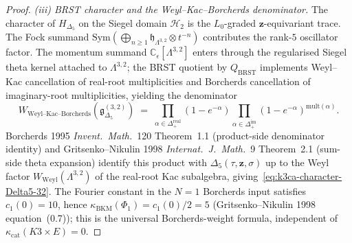 \begin{proof}
\emph{(iii) BRST character and the Weyl--Kac--Borcherds denominator.}
The character of $H_{\Delta_5}$ on the Siegel domain $\mathcal H_2$
is the $L_0$-graded $\mathbf z$-equivariant trace. The Fock summand
$\mathrm{Sym}(\bigoplus_{n\geq 1}\mathfrak h_{\Lambda^{3,2}}\otimes t^{-n})$
contributes the rank-$5$ oscillator factor. The momentum summand
$\mathbb C_\epsilon[\Lambda^{3,2}]$ enters through the regularised Siegel
theta kernel attached to $\Lambda^{3,2}$; the BRST quotient
by $Q_{\mathrm{BRST}}$ implements Weyl--Kac cancellation of real-root
multiplicities and Borcherds cancellation of imaginary-root
multiplicities, yielding the denominator
\[
 W_{\mathrm{Weyl\text{--}Kac\text{--}Borcherds}}(\mathfrak g_{\Delta_5}^{(3,2)})
 \;=\;
 \prod_{\alpha\in\Delta_+^{\mathrm{real}}}(1-e^{-\alpha})
 \prod_{\alpha\in\Delta_+^{\mathrm{im}}}(1-e^{-\alpha})^{\mathrm{mult}(\alpha)}.
\]
Borcherds 1995 \emph{Invent.\ Math.}~120 Theorem~1.1
(product-side denominator identity) and Gritsenko--Nikulin 1998
\emph{Internat.\ J.\ Math.}~9 Theorem~2.1 (sum-side theta expansion)
identify this product with $\Delta_5(\tau,\mathbf z,\sigma)$ up to
the Weyl factor $W_{\mathrm{Weyl}}(\Lambda^{3,2})$ of the
real-root Kac subalgebra, giving~\eqref{eq:k3ca-character-Delta5-32}.
The Fourier constant in the \(N=1\) Borcherds input satisfies
\(c_1(0)=10\), hence
\(\kappa_{\mathrm{BKM}}(\Phi_1)=c_1(0)/2=5\)
(Gritsenko--Nikulin 1998 equation~(0.7)); this is the
universal Borcherds-weight formula, independent of
\(\kappa_{\mathrm{cat}}(K3\times E)=0\).
\end{proof}

